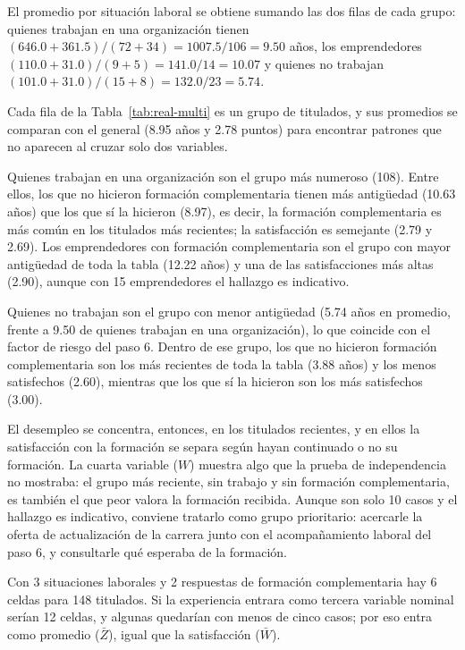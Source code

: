 \documentclass[12pt, a4paper]{article}
\begin{document}
El promedio por situación laboral se obtiene sumando las dos filas de
cada grupo: quienes trabajan en una organización tienen $(646.0 +
361.5)/(72 + 34) = 1007.5/106 = 9.50$ años, los emprendedores $(110.0 +
31.0)/(9 + 5) = 141.0/14 = 10.07$ y quienes no trabajan $(101.0 +
31.0)/(15 + 8) = 132.0/23 = 5.74$.

Cada fila de la Tabla~\ref{tab:real-multi} es un grupo de titulados, y
sus promedios se comparan con el general (8.95 años y 2.78 puntos) para
encontrar patrones que no aparecen al cruzar solo dos variables.

Quienes trabajan en una organización son el grupo más numeroso (108).
Entre ellos, los que no hicieron formación complementaria tienen más
antigüedad (10.63 años) que los que sí la hicieron (8.97), es decir, la
formación complementaria es más común en los titulados más recientes; la
satisfacción es semejante (2.79 y 2.69). Los emprendedores con formación
complementaria son el grupo con mayor antigüedad de toda la tabla (12.22
años) y una de las satisfacciones más altas (2.90), aunque con 15
emprendedores el hallazgo es indicativo.

Quienes no trabajan son el grupo con menor antigüedad (5.74 años en
promedio, frente a 9.50 de quienes trabajan en una organización), lo que
coincide con el factor de riesgo del paso 6. Dentro de ese grupo, los que
no hicieron formación complementaria son los más recientes de toda la
tabla (3.88 años) y los menos satisfechos (2.60), mientras que los que sí
la hicieron son los más satisfechos (3.00).

El desempleo se concentra, entonces, en los titulados recientes, y en
ellos la satisfacción con la formación se separa según hayan continuado o
no su formación. La cuarta variable ($W$) muestra algo que la prueba de
independencia no mostraba: el grupo más reciente, sin trabajo y sin
formación complementaria, es también el que peor valora la formación
recibida. Aunque son solo 10 casos y el hallazgo es indicativo, conviene
tratarlo como grupo prioritario: acercarle la oferta de actualización de
la carrera junto con el acompañamiento laboral del paso 6, y consultarle
qué esperaba de la formación.

Con 3 situaciones laborales y 2 respuestas de formación complementaria
hay 6 celdas para 148 titulados. Si la experiencia entrara como tercera
variable nominal serían 12 celdas, y algunas quedarían con menos de cinco
casos; por eso entra como promedio ($\bar{Z}$), igual que la satisfacción
($\bar{W}$).
\end{document}
